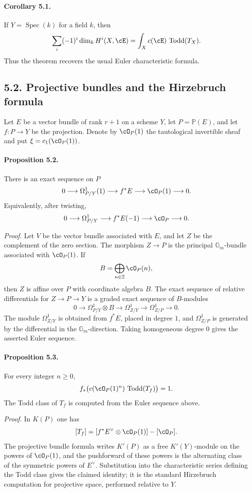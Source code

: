 \documentclass[11pt]{article}
\theoremstyle{plain}
\theoremstyle{definition}
\theoremstyle{remark}
\newcommand{\bP}{\mathbb P}
\newcommand{\GG}{\mathbb G}
\newcommand{\ZZ}{\mathbb Z}
\DeclareMathOperator{\Spec}{Spec}
\newcommand{\longto}{\longrightarrow}
\providecommand{\Todd}{\operatorname{Todd}}
\begin{document}
\paragraph{Corollary 5.1.}
If $Y=\Spec(k)$ for a field $k$, then
\[
 \sum_i(-1)^i\dim_k H^i(X,\cE)=\int_X c(\cE)\,\Todd(T_X).
\]
Thus the theorem recovers the usual Euler characteristic formula.

\subsection*{5.2. Projective bundles and the Hirzebruch formula}

Let $E$ be a vector bundle of rank $r+1$ on a scheme $Y$, let $P=\bP(E)$, and let $f:P\to Y$ be the projection. Denote by $\cO_P(1)$ the tautological invertible sheaf and put $\xi=c_1(\cO_P(1))$.

\paragraph{Proposition 5.2.}
There is an exact sequence on $P$
\[
0\longto \Omega^1_{P/Y}(1)\longto f^*E\longto \cO_P(1)\longto0.
\]
Equivalently, after twisting,
\[
0\longto \Omega^1_{P/Y}\longto f^*E(-1)\longto \cO_P\longto0.
\]

\emph{Proof.}
Let $V$ be the vector bundle associated with $E$, and let $Z$ be the complement of the zero section. The morphism $Z\to P$ is the principal $\GG_m$-bundle associated with $\cO_P(1)$. If
\[
B=\bigoplus_{n\in\ZZ}\cO_P(n),
\]
then $Z$ is affine over $P$ with coordinate algebra $B$. The exact sequence of relative differentials for $Z\to P\to Y$ is a graded exact sequence of $B$-modules
\[
0\longto \Omega^1_{P/Y}\otimes B\longto \Omega^1_{Z/Y}\longto \Omega^1_{Z/P}\longto0.
\]
The module $\Omega^1_{Z/Y}$ is obtained from $f^*E$, placed in degree $1$, and $\Omega^1_{Z/P}$ is generated by the differential in the $\GG_m$-direction. Taking homogeneous degree $0$ gives the asserted Euler sequence.

\paragraph{Proposition 5.3.}
For every integer $n\geq0$,
\[
 f_*\bigl(c(\cO_P(1)^n)\,\Todd(T_f)\bigr)=1.
\]
The Todd class of $T_f$ is computed from the Euler sequence above.

\emph{Proof.}
In $K(P)$ one has
\[
[T_f]=[f^*E^\vee\otimes \cO_P(1)]-[\cO_P].
\]
The projective bundle formula writes $K'(P)$ as a free $K'(Y)$-module on the powers of $\cO_P(1)$, and the pushforward of these powers is the alternating class of the symmetric powers of $E^\vee$. Substitution into the characteristic series defining the Todd class gives the claimed identity; it is the standard Hirzebruch computation for projective space, performed relative to $Y$.
\end{document}
